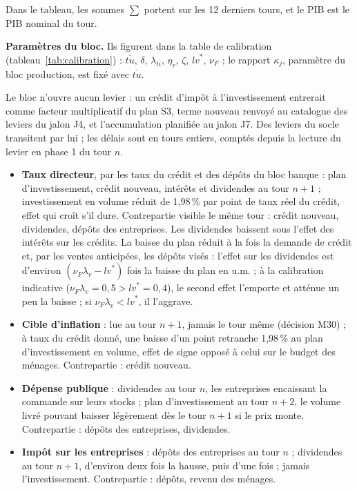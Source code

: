 \documentclass[11pt,a4paper]{article}
\begin{document}
Dans le tableau, les sommes $\sum$ portent sur les 12 derniers tours, et le PIB est le PIB nominal du tour.

\textbf{Paramètres du bloc.} Ils figurent dans la table de calibration (tableau~\ref{tab:calibration}) : $\overline{\mathit{tu}}$, $\delta$, $\lambda_{\mathit{ti}}$, $\eta_r$, $\zeta$, $\mathit{lv}^\ast$, $\nu_F$ ; le rapport $\kappa_j$, paramètre du bloc production, est fixé avec $\overline{\mathit{tu}}$.

\begin{joueur}
Le bloc n'ouvre aucun levier : un crédit d'impôt à l'investissement entrerait comme facteur multiplicatif du plan S3, terme nouveau renvoyé au catalogue des leviers du jalon J4, et l'accumulation planifiée au jalon J7. Des leviers du socle transitent par lui ; les délais sont en tours entiers, comptés depuis la lecture du levier en phase 1 du tour $n$.
\begin{itemize}
\item \textbf{Taux directeur}, par les taux du crédit et des dépôts du bloc banque : plan d'investissement, crédit nouveau, intérêts et dividendes au tour $n + 1$ ; investissement en volume réduit de 1,98\,\% par point de taux réel du crédit, effet qui croît s'il dure. Contrepartie visible le même tour : crédit nouveau, dividendes, dépôts des entreprises. Les dividendes baissent sous l'effet des intérêts sur les crédits. La baisse du plan réduit à la fois la demande de crédit et, par les ventes anticipées, les dépôts visés : l'effet sur les dividendes est d'environ $(\nu_F\lambda_v - \mathit{lv}^\ast)$ fois la baisse du plan en u.m. ; à la calibration indicative ($\nu_F\lambda_v = 0{,}5 > \mathit{lv}^\ast = 0{,}4$), le second effet l'emporte et atténue un peu la baisse ; si $\nu_F\lambda_v < \mathit{lv}^\ast$, il l'aggrave.
\item \textbf{Cible d'inflation} : lue au tour $n + 1$, jamais le tour même (décision M30) ; à taux du crédit donné, une baisse d'un point retranche 1,98\,\% au plan d'investissement en volume, effet de signe opposé à celui sur le budget des ménages. Contrepartie : crédit nouveau.
\item \textbf{Dépense publique} : dividendes au tour $n$, les entreprises encaissant la commande sur leurs stocks ; plan d'investissement au tour $n + 2$, le volume livré pouvant baisser légèrement dès le tour $n + 1$ si le prix monte. Contrepartie : dépôts des entreprises, dividendes.
\item \textbf{Impôt sur les entreprises} : dépôts des entreprises au tour $n$ ; dividendes au tour $n + 1$, d'environ deux fois la hausse, puis d'une fois ; jamais l'investissement. Contrepartie : dépôts, revenu des ménages.

\end{itemize}
\end{joueur}
\end{document}
